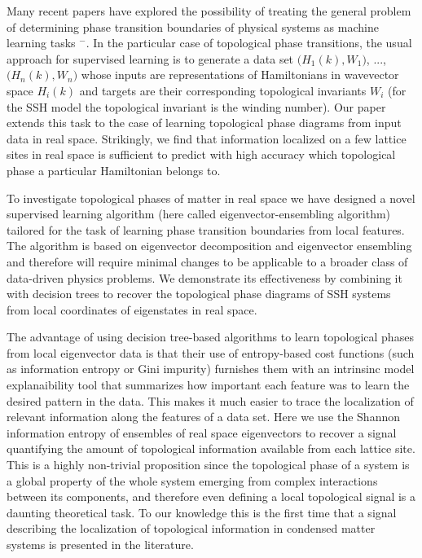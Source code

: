 \documentclass[fleqn,10pt]{wlscirep}
\begin{document}
Many recent papers have explored the possibility of treating the general problem of determining phase transition boundaries of physical systems as machine learning tasks \cite{carrasquilla2017machine}$^-$\cite{rodriguez2018identifying}. In the particular case of topological phase transitions, the usual approach for supervised learning is to generate a data set $\big(H_1(k), W_1\big)$, ..., $\big(H_n(k), W_n\big)$ whose inputs are representations of Hamiltonians in wavevector space $H_i(k)$ and targets are their corresponding topological invariants $W_i$ (for the SSH model the topological invariant is the winding number). Our paper extends this task to the case of learning topological phase diagrams from input data in real space. Strikingly, we find that information localized on a few lattice sites in real space is sufficient to predict with high accuracy which topological phase a particular Hamiltonian belongs to.

To investigate topological phases of matter in real space we have designed a novel supervised learning algorithm (here called eigenvector-ensembling algorithm) tailored for the task of learning phase transition boundaries from local features. The algorithm is based on eigenvector decomposition and eigenvector ensembling and therefore will require minimal changes to be applicable to a broader class of data-driven physics problems. We demonstrate its effectiveness by combining it with decision trees to recover the topological phase diagrams of SSH systems from local coordinates of eigenstates in real space.

The advantage of using decision tree-based algorithms to learn topological phases from local eigenvector data is that their use of entropy-based cost functions (such as information entropy or Gini impurity) furnishes them with an intrinsinc model explanaibility tool that summarizes how important each feature was to learn the desired pattern in the data. This makes it much easier to trace the localization of relevant information along the features of a data set. Here we use the Shannon information entropy of ensembles of real space eigenvectors to recover a signal quantifying the amount of topological information available from each lattice site. This is a highly non-trivial proposition since the topological phase of a system is a global property of the whole system emerging from complex interactions between its components, and therefore even defining a local topological signal is a daunting theoretical task. To our knowledge this is the first time that a signal describing the localization of topological information in condensed matter systems is presented in the literature.
\end{document}
